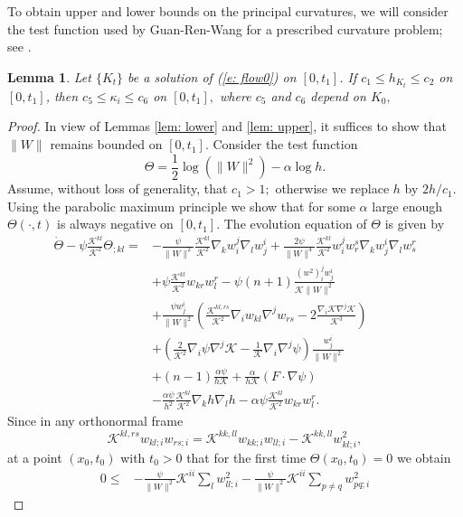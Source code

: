 \documentclass{amsart}
\newtheorem{lemma}[theorem]{Lemma}
\theoremstyle{definition}
\theoremstyle{remark}
\numberwithin{equation}{section}
\begin{document}
 To obtain upper and lower bounds on the principal curvatures, we will consider the test function used by Guan-Ren-Wang for a prescribed curvature problem; see \cite[(4.2)]{Guan}.
\begin{lemma}\label{lem: final}
Let $\{K_t\}$ be a solution of (\ref{e: flow0}) on $[0,t_1]$. If $c_1\leq h_{K_t}\leq c_2$ on $[0,t_1]$, then $c_5\leq \kappa_i\le c_6$ on $[0,t_1],$ where $c_5$ and $c_6$ depend on $K_0,$
\end{lemma}
\begin{proof}
In view of Lemmas \ref{lem: lower} and \ref{lem: upper}, it suffices to show that $\|W\|$ remains bounded on $[0,t_1]$. Consider the test function
\[\Theta=\frac 12\log(\|W\|^2)-\alpha\log h.\]
Assume, without loss of generality, that $c_1> 1;$ otherwise we replace $h$ by $2h/c_1.$
Using the parabolic maximum principle we show that for some $\alpha$ large enough $\Theta(\cdot,t)$ is always negative on $[0,t_1]$. The evolution equation of $\Theta$
is given by
\begin{align*}
\dot{\Theta}-\psi\frac{\mathcal{K}^{kl}}{\mathcal{K}^2}\Theta_{;kl}=&-\frac{\psi}{\|W\|^2}\frac{\mathcal{K}^{kl}}{\mathcal{K}^2}\nabla_kw_i^j\nabla_lw_j^i
+\frac{2\psi}{\|W\|^4}\frac{\mathcal{K}^{kl}}{\mathcal{K}^2}w^j_iw^s_r\nabla_kw^i_j \nabla_lw^r_{s}\\
&+\psi\frac{\mathcal{K}^{kl}}{\mathcal{K}^2}w_{kr}w_l^r-\psi(n+1)\frac{(w^2)_i^jw_j^i}{\mathcal{K}\|W\|^2}\\
&+\frac{\psi w^i_j}{\|W\|^2}\left(\frac{\mathcal{K}^{kl,rs}}{\mathcal{K}^2}\nabla_iw_{kl}\nabla^jw_{rs}-2\frac{\nabla_i\mathcal{K}\nabla^j\mathcal{K}}{\mathcal{K}^3}\right)\\
&+\left(\frac{2}{\mathcal{K}^2}\nabla_i\psi\nabla^j\mathcal{K}-\frac{1}{\mathcal{K}}\nabla_i\nabla^j\psi\right)\frac{w^i_j}{\|W\|^2}\\
&+(n-1)\frac{\alpha\psi}{h\mathcal{K}}+\frac{\alpha}{h\mathcal{K}}(F\cdot\nabla\psi)\\
&-\frac{\alpha\psi}{h^2}\frac{\mathcal{K}^{kl}}{\mathcal{K}^2}\nabla_kh\nabla_lh
-\alpha\psi\frac{\mathcal{K}^{kl}}{\mathcal{K}^2}w_{kr}w_l^r.
\end{align*}
Since in any orthonormal frame $$\mathcal{K}^{kl,rs}w_{kl;i}w_{rs;i}=\mathcal{K}^{kk,ll}w_{kk;i}w_{ll;i}-\mathcal{K}^{kk,ll}w_{kl;i}^2,$$ at a point $(x_0,t_0)$ with $t_0>0$ that for the first time $\Theta(x_0,t_0)=0$ we obtain
\begin{align*}
0\leq& -\frac{\psi}{\|W\|^2}\mathcal{K}^{ii}\sum_lw_{ll;i}^2-\frac{\psi}{\|W\|^2}\mathcal{K}^{ii}\sum_{p\ne q}w_{pq;i}^2

\end{align*}
\end{proof}
\end{document}
